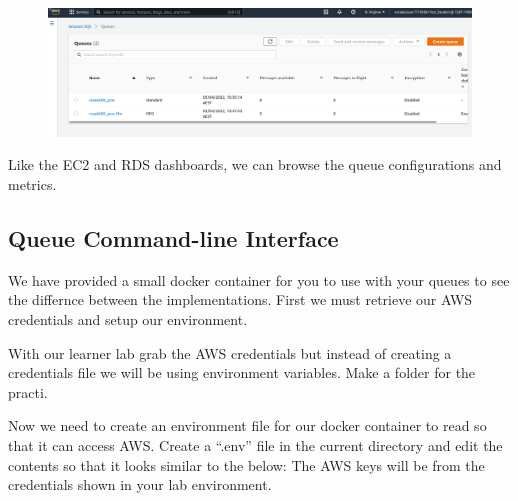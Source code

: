 \documentclass{csse4400}
\begin{document}
\begin{figure}[H]
  \includegraphics[width=\textwidth]{images/sqspanel}
\end{figure}

Like the EC2 and RDS dashboards,
we can browse the queue configurations and metrics.
  

\subsection{Queue Command-line Interface}

We have provided a small docker container for you to use with your queues to see the differnce between the implementations.
First we must retrieve our AWS credentials and setup our environment.

With our learner lab grab the AWS credentials but instead of creating a credentials file we will be using environment variables.
Make a folder for the practi.


Now we need to create an environment file for our docker container to read so that it can access AWS. Create a ``.env'' file in the current directory and edit the contents so that it looks similar to the below: The AWS keys will be from the credentials shown in your lab environment.
\end{document}
